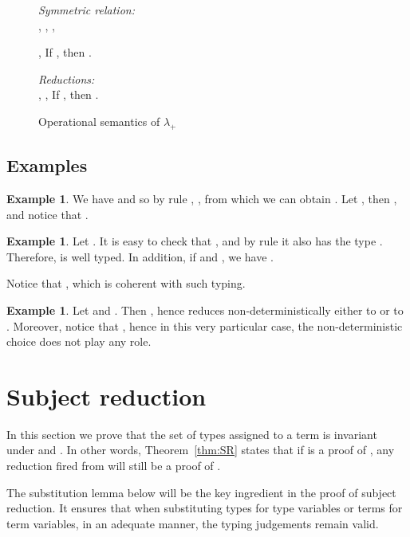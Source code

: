 \documentclass[final,copyright,creativecommons]{eptcs}
\newcommand{\OurCalculus}{\ensuremath{\lambda_+}}
\theoremstyle{definition}
\newtheorem{example}[theorem]{Example}
\begin{document}
\begin{figure}[!h]\centering
    \emph{Symmetric relation:}\\
    \hspace{1cm},\hfill
	,\hfill
    ,\hspace{1cm}

	\hspace{1cm},\hfill
	If , then .\hspace{1cm}
\vspace{0.3cm}

	\emph{Reductions:}\\
    \hspace{1cm},\hfill
	,\hfill
    If , then .\hspace{1cm}

	\caption{Operational semantics of \OurCalculus}
	\label{fig:opSem}
\end{figure}

\subsection{Examples}
\begin{example} We have
  and so by rule ,
 , from which we can obtain .
 Let , then ,
and notice that
 .
\end{example}

\begin{example} Let . It is easy to check that , and by rule  it also has the type . Therefore,  is well typed. In addition, if  and , we have .

Notice that
,
which is coherent with such typing.
\end{example}

\begin{example}
 Let  and . Then , hence  reduces non-deterministically either to  or to . Moreover, notice that , hence in this very particular case, the non-deterministic choice does not play any role.
\end{example}

\section{Subject reduction}\label{sec:SR}
In this section we prove that the set of types assigned to a term is invariant under  and .
In other words, Theorem~\ref{thm:SR} states that if  is a proof of , any reduction fired from  will still be a proof of .

The substitution lemma below will be the key ingredient in the proof of subject reduction.
It ensures that when substituting types for type variables or terms for term variables,
in an adequate manner, the typing judgements remain valid.
\end{document}
